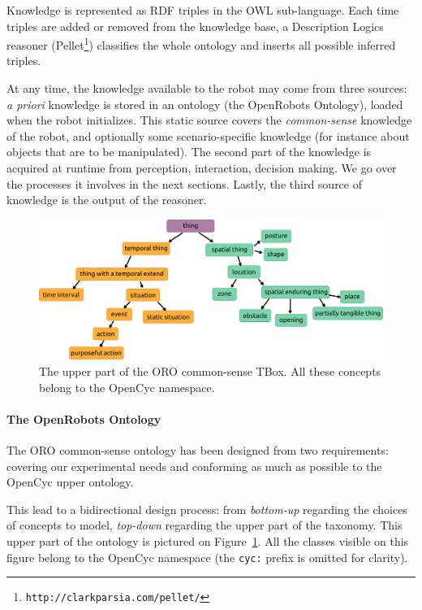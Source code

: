 \documentclass[preprint,3p,times]{elsarticle}
\begin{document}
Knowledge is represented as RDF triples in the OWL sub-language. Each
time triples are added or removed from the knowledge base, a Description
Logics reasoner ({\sc Pellet}\footnote{\tt http://clarkparsia.com/pellet/})
classifies the whole ontology and inserts all possible inferred triples.

At any time, the knowledge available to the robot may come from three sources:
{\it a priori} knowledge is stored in an ontology (the {\sc OpenRobots Ontology}),
loaded when the robot initializes. This static source covers the
\emph{common-sense} knowledge of the robot, and optionally some
scenario-specific knowledge (for instance about objects that are to be
manipulated). The second part of the knowledge is acquired at runtime from
perception, interaction, decision making.  We go over the processes it involves
in the next sections. Lastly, the third source of knowledge is the output of the
reasoner.

\begin{figure}
    \centering
    \includegraphics[width=\columnwidth]{top_tbox.pdf}

    \caption{The upper part of the ORO common-sense TBox. All these concepts
    belong to the {\sc OpenCyc} namespace.}
    
    \label{fig|upper_tbox}
\end{figure}

\paragraph{The OpenRobots Ontology} The ORO common-sense ontology has been designed from two requirements: covering
our experimental needs and conforming as much as possible to the {\sc OpenCyc}
upper ontology.

This lead to a bidirectional design process: from \emph{bottom-up} regarding
the choices of concepts to model, \emph{top-down} regarding the upper part of the
taxonomy. This upper part of the ontology is pictured on
Figure~\ref{fig|upper_tbox}. All the classes visible on this figure belong to the
{\sc OpenCyc} namespace (the {\tt cyc:} prefix is omitted for clarity).
\end{document}
